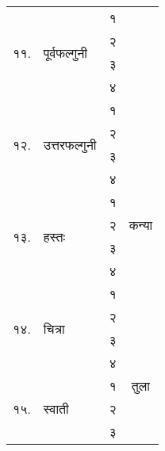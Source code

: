 \begin{longtable}{|l@{~}l|>{\tiny}c|c|}
  \cline{1-3}\multirow{4}{*}{११.} & \multirow{4}{*}{पूर्वफल्गुनी}              & १            &                         \\*
  &                                        & २            &                         \\*
  &                                        & ३            &                         \\*
  &                                        & ४            &                         \\*
  \cline{1-3}\multirow{4}{*}{१२.} & \multirow{4}{*}{उत्तरफल्गुनी}             & १            &                         \\*
  \cline{3-4}                     &                                        & २            & \multirow{9}{*}{कन्या}   \\*
  &                                        & ३            &                         \\*
  &                                        & ४            &                         \\*
  \cline{1-3}\multirow{4}{*}{१३.} & \multirow{4}{*}{हस्तः}                  & १            &                         \\*
  &                                        & २            &                         \\*
  &                                        & ३            &                         \\*
  &                                        & ४            &                         \\*
  \cline{1-3}\multirow{4}{*}{१४.} & \multirow{4}{*}{चित्रा}                 & १            &                         \\*
  &                                        & २            &                         \\*
  \cline{3-4}                     &                                        & ३            & \multirow{9}{*}{तुला}    \\*
  &                                        & ४            &                         \\*
  \cline{1-3}\multirow{4}{*}{१५.} & \multirow{4}{*}{स्वाती}                 & १            &                         \\*
  &                                        & २            &                         \\*
  &                                        & ३            &                         \\*

\end{longtable}
